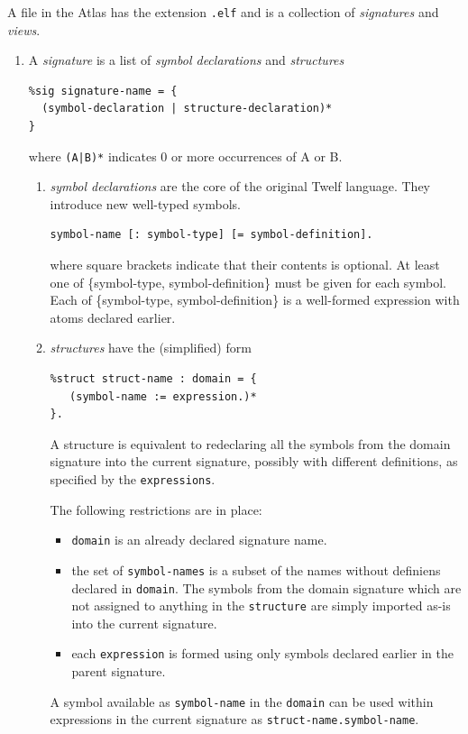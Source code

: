 A file in the Atlas has the extension {\tt .elf} and is a collection of \textit{signatures} and \textit{views}.
\begin{enumerate}
\item A \textit{signature} is a list of \textit{symbol declarations} and \textit{structures}
\begin{verbatim}
%sig signature-name = {
  (symbol-declaration | structure-declaration)*
}
\end{verbatim}
where {\tt (A|B)*} indicates 0 or more occurrences of A or B.
	
	\begin{enumerate} 
	
	\item \textit{symbol declarations} are the core of the original Twelf language. They introduce new well-typed symbols.
\begin{verbatim}
symbol-name [: symbol-type] [= symbol-definition].
\end{verbatim}
where square brackets indicate that their contents is optional. At least one of \{symbol-type, symbol-definition\} must be given for each symbol. Each of \{symbol-type, symbol-definition\} is a well-formed expression with atoms declared earlier.
	
	\item \textit{structures} have the (simplified) form
\begin{verbatim}
%struct struct-name : domain = { 
   (symbol-name := expression.)*
}.
\end{verbatim}
A structure is equivalent to redeclaring all the symbols from the domain signature into the current signature, possibly with different definitions, as specified by the {\tt expressions}. 

The following restrictions are in place:
	\begin{itemize}
	\item {\tt domain} is an already declared signature name.
	\item the set of {\tt symbol-names} is a subset of the names without definiens declared in {\tt domain}. The symbols from the domain signature which are not assigned to anything in the {\tt structure} are simply imported as-is into the current signature.
	\item each {\tt expression} is formed using only symbols declared earlier in the parent signature.
	\end{itemize}
	A symbol available as {\tt symbol-name} in the {\tt domain} can be used within expressions in the current signature as {\tt struct-name.symbol-name}.
	

\end{enumerate}
\end{enumerate}
